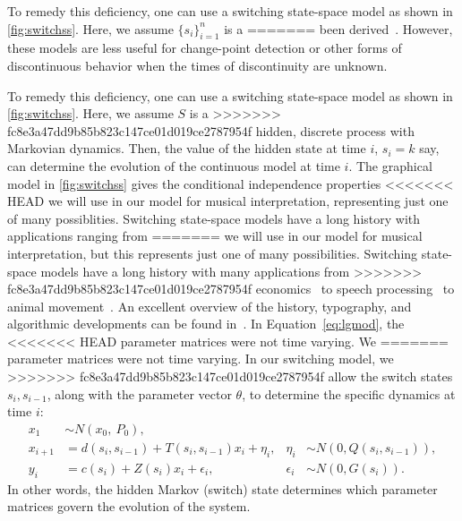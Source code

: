 \documentclass[aoas]{imsart}
\begin{document}
To remedy this deficiency, one can use a switching state-space
model as shown in \autoref{fig:switchss}. Here, we assume $\{s_i\}_{i=1}^n$ is a
=======
been derived~\citep[e.g.,][]{KoyamaPerez-Bolde2010,AndrieuDoucet2010}. 
However, these models are less useful
for change-point detection or other forms of discontinuous behavior
when the times of discontinuity are unknown. 

To remedy this deficiency, one can use a switching state-space
model as shown in \autoref{fig:switchss}. Here, we assume $S$ is a
>>>>>>> fc8e3a47dd9b85b823c147ce01d019ce2787954f
hidden, discrete process with Markovian dynamics. Then, the value of
the hidden state at time $i$, $s_i=k$ say, can determine the evolution of
the continuous model at time $i$. The graphical model in
\autoref{fig:switchss} gives the conditional independence properties
<<<<<<< HEAD
we will use in our model for musical interpretation, 
representing just one of many possiblities. Switching state-space models have a long
history with applications ranging from
=======
we will use in our model for musical interpretation, but this
represents just one of many possibilities. Switching state-space models have a long
history with many applications from
>>>>>>> fc8e3a47dd9b85b823c147ce01d019ce2787954f
economics~\citep{KimNelson1998,Kim1994,Hamilton2011} to speech
processing~\citep{FoxSudderth2011} to animal
movement~\citep{PattersonThomas2008,BlockJonsen2011}. An excellent
overview of the history, typography, and algorithmic developments can
be found in~\citep{GhahramaniHinton2000}. In Equation~\eqref{eq:lgmod}, the
<<<<<<< HEAD
parameter matrices were not time varying. We
=======
parameter matrices were not time varying. In our switching model, we
>>>>>>> fc8e3a47dd9b85b823c147ce01d019ce2787954f
allow the switch states $s_i, s_{i-1}$, along with the parameter
vector $\theta$, to determine the specific dynamics at time $i$:
\begin{equation}
  \begin{aligned}
    x_1 &\sim N(x_0,\ P_0),\\
    x_{i+1}&= d(s_i,s_{i-1})+T(s_i,s_{i-1}) x_i + \eta_i, 
    & \eta_i &\sim N(0,Q(s_i,s_{i-1})),\\
    y_i&= c(s_i) + Z(s_i) x_i + \epsilon_i, & \epsilon_i &\sim N(0, G(s_i)).
  \end{aligned}
\end{equation}
In other words, the hidden Markov (switch) state determines which parameter
matrices govern the evolution of the system. 
\end{document}

